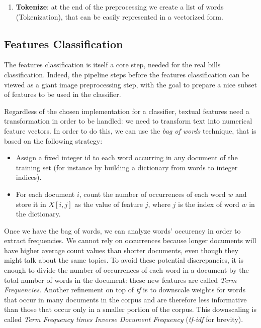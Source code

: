\documentclass[10pt,twocolumn,letterpaper]{article}
\begin{document}
\begin{enumerate}
    linguistics is the process of grouping together the inflected
    forms of a word, so they can be analysed as a single item,
    identified by the word's lemma, or dictionary
    form.\footnote{\href{
        https://en.wikipedia.org/wiki/Lemmatisation}{
        https://en.wikipedia.org/wiki/Lemmatisation}}. Thanks this
    step, indeed, we tried to group words together in order to
    simplify the classification phase. However, we noticed that this
    step does not improve the performance and it can also produce
    worse results as it tries to group wrong words retrieved from the
    OCR.
  \item \textbf{Tokenize}: at the end of the preprocessing we create a
    list of words (Tokenization), that can be easily represented in a
    vectorized form.
\end{enumerate}

\subsection{Features Classification}
\label{subsec:classification}

The features classification is itself a core step, needed for the real
bills classification. Indeed, the pipeline steps before the features
classification can be viewed as a giant image preprocessing step, with
the goal to prepare a nice subset of features to be used in the
classifier.

Regardless of the chosen implementation for a classifier, textual
features need a transformation in order to be handled: we need to
transform text into numerical feature vectors. In order to do this, we
can use the \emph{bag of words} technique, that is based on the
following strategy:

\begin{itemize}
  \item Assign a fixed integer id to each word occurring in any
    document of the training set (for instance by building a
    dictionary from words to integer indices).
  \item For each document $i$, count the number of occurrences of each
    word $w$ and store it in $X[i, j]$ as the value of feature $j$,
    where $j$ is the index of word $w$ in the dictionary.
\end{itemize}

Once we have the bag of words, we can analyze words' occurency in
order to extract frequencies. We cannot rely on occurrences because
longer documents will have higher average count values than shorter
documents, even though they might talk about the same topics. To avoid
these potential discrepancies, it is enough to divide the number of
occurrences of each word in a document by the total number of words in
the document: these new features are called \emph{Term
  Frequencies}. Another refinement on top of \emph{tf} is to downscale
weights for words that occur in many documents in the corpus and are
therefore less informative than those that occur only in a smaller
portion of the corpus. This downscaling is called \emph{Term Frequency
  times Inverse Document Frequency} (\emph{tf-idf} for brevity).
\end{document}
